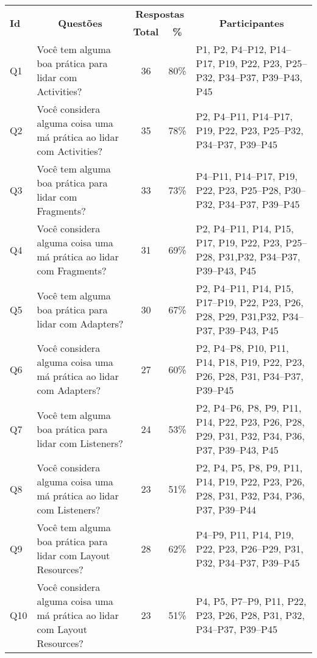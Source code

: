 \begin{table*}[t]
\centering
\footnotesize
\begin{tabular}{@{}lp{8.5cm}ccp{6cm}@{}}
\toprule
\multirow{2}{*}{\textbf{Id}}& \multicolumn{1}{c}{\multirow{2}{*}{\textbf{Questões}}} 	& \multicolumn{2}{c}{\textbf{Respostas}}	& \multicolumn{1}{c}{\multirow{2}{*}{\textbf{Participantes}}} \\ \cmidrule{3-4}
					 		& 															& \textbf{Total} & \textbf{\%} & \\
\hline

Q1	& Você tem alguma boa prática para lidar com Activities?															&36 &80\%	&P1, P2, P4--P12, P14--P17, P19, P22, P23, P25--P32, P34--P37, P39--P43, P45 \\
Q2	& Você considera alguma coisa uma má prática ao lidar com Activities?									&35 &78\%	&P2, P4--P11, P14--P17, P19, P22, P23, P25--P32, P34--P37, P39--P45 \\
Q3	& Você tem alguma boa prática para lidar com Fragments?															&33	&73\%	&P4--P11, P14--P17, P19, P22, P23, P25--P28, P30--P32, P34--P37, P39--P45 \\
Q4	& Você considera alguma coisa uma má prática ao lidar com Fragments?										&31	&69\%	&P2, P4--P11, P14, P15, P17, P19, P22, P23, P25--P28, P31,P32, P34--P37, P39--P43, P45 \\
Q5	& Você tem alguma boa prática para lidar com Adapters?																&30	&67\%	&P2, P4--P11, P14, P15, P17--P19, P22, P23, P26, P28, P29, P31,P32, P34--P37, P39--P43, P45 \\
Q6	& Você considera alguma coisa uma má prática ao lidar com Adapters?										&27	&60\%	&P2, P4--P8, P10, P11, P14, P18, P19, P22, P23, P26, P28, P31, P34--P37, P39--P45 \\
Q7	& Você tem alguma boa prática para lidar com Listeners?															&24	&53\%	&P2, P4--P6, P8, P9, P11, P14, P22, P23, P26, P28, P29, P31, P32, P34, P36, P37, P39--P43, P45 \\
Q8	& Você considera alguma coisa uma má prática ao lidar com Listeners?										&23	&51\%	&P2, P4, P5, P8, P9, P11, P14, P19, P22, P23, P26, P28, P31, P32, P34, P36, P37, P39--P44 \\
Q9	& Você tem alguma boa prática para lidar com Layout Resources?														&28	&62\%	&P4--P9, P11, P14, P19, P22, P23, P26--P29, P31, P32, P34--P37, P39--P45 \\
Q10	& Você considera alguma coisa uma má prática ao lidar com Layout Resources?								&23	&51\%	&P4, P5, P7--P9, P11, P22, P23, P26, P28, P31, P32, P34--P37, P39--P45 \\

\end{tabular}
\end{table*}
